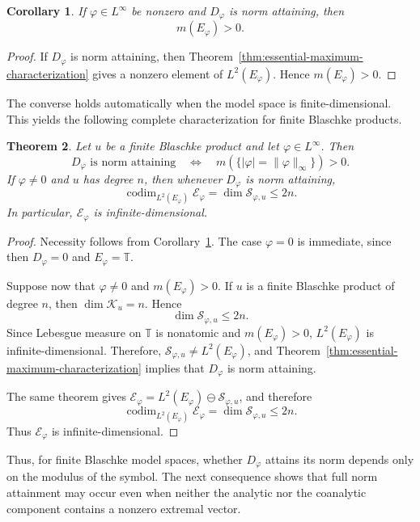 \documentclass[12pt]{amsart}
\newtheorem{theorem}{Theorem}[section]
\newtheorem{corollary}[theorem]{Corollary}
\theoremstyle{definition}
\theoremstyle{remark}
\def \T{\mathbb{T}}
\newcommand{\cle}{\mathcal{E}}
\newcommand{\clk}{\mathcal{K}}
\newcommand{\cls}{\mathcal{S}}
\newcommand{\vp}{\varphi}
\numberwithin{equation}{section}
\begin{document}
\begin{corollary}\label{cor:essential-maximum-necessary}
If $\vp\in L^\infty$ be nonzero and $D_\vp$ is norm attaining, then
\[
m(E_\vp)>0.
\]
\end{corollary}

\begin{proof}
If $D_\vp$ is norm attaining, then Theorem~\ref{thm:essential-maximum-characterization} gives a nonzero
element of $L^2(E_\vp)$. Hence $m(E_\vp)>0$.
\end{proof}


The converse holds automatically when the model space is
finite-dimensional. This yields the following complete
characterization for finite Blaschke products.

\begin{theorem}\label{thm:finite-Blaschke-norm-attainment}
Let $u$ be a finite Blaschke product and let $\vp\in L^\infty$. Then
\[
D_\vp\text{ is norm attaining}\quad\Longleftrightarrow\quad
m\left(\{|\vp|=\|\vp\|_\infty\}\right)>0.
\]
If $\vp\neq0$ and $u$ has degree $n$, then whenever $D_\vp$ is norm
attaining,
\[
\operatorname{codim}_{L^2(E_\vp)}\cle_\vp=\dim\cls_{\vp,u}
\leq 2n.
\]
In particular, $\cle_\vp$ is infinite-dimensional.
\end{theorem}

\begin{proof}
Necessity follows from Corollary~\ref{cor:essential-maximum-necessary}. The case $\vp=0$ is
immediate, since then $D_\vp=0$ and $E_\vp=\T$.
	
Suppose now that $\vp\neq0$ and $m(E_\vp)>0$. If $u$ is a finite
Blaschke product of degree $n$, then $\dim\clk_u=n$. Hence
\[
\dim\cls_{\vp,u}\leq2n.
\]
Since Lebesgue measure on $\T$ is nonatomic and $m(E_\vp)>0$,
$L^2(E_\vp)$ is infinite-dimensional. Therefore, $\cls_{\vp,u}\neq L^2(E_\vp)$, and Theorem~\ref{thm:essential-maximum-characterization} implies that
$D_\vp$ is norm attaining.
	
The same theorem gives $\cle_\vp=L^2(E_\vp)\ominus\cls_{\vp,u}$, and therefore
\[
\operatorname{codim}_{L^2(E_\vp)}\cle_\vp =\dim\cls_{\vp,u}\leq2n.
\]
Thus $\cle_\vp$ is infinite-dimensional.
\end{proof}

Thus, for finite Blaschke model spaces, whether $D_\vp$ attains its norm depends only on the modulus of the symbol. The next consequence shows that full norm attainment may occur even when neither the analytic nor the coanalytic component contains a nonzero extremal vector.
\end{document}
